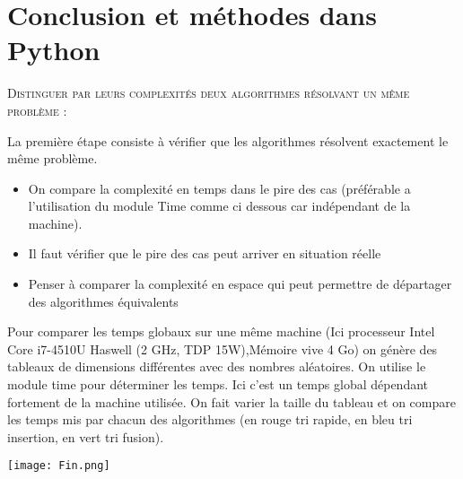 
\section{Conclusion et méthodes dans Python}



\begin{prop}

\textsc{Distinguer par leurs complexités deux algorithmes résolvant
un même problème :}

La première étape consiste à vérifier que les algorithmes résolvent exactement le même problème.

\begin{itemize}
\item On compare la complexité en temps dans le pire des cas (préférable a l'utilisation du module Time comme ci dessous car indépendant de la machine).
\item Il faut vérifier que le pire des cas peut arriver en situation réelle
\item Penser à comparer la complexité en espace qui peut permettre de départager des algorithmes équivalents
\end{itemize}
\end{prop}

\begin{exemple2}

Pour comparer les temps globaux sur une même machine (Ici processeur	Intel Core i7-4510U Haswell (2 GHz, TDP 15W),Mémoire vive 4 Go) on génère des tableaux de dimensions différentes avec des nombres aléatoires.
On utilise le module time pour déterminer les temps. Ici c'est un temps global dépendant fortement de la machine utilisée.
On fait varier la taille du tableau et on compare les temps mis par chacun des algorithmes (en rouge tri rapide, en bleu tri insertion, en vert tri fusion). 

\begin{center}
\texttt{[image: Fin.png]}
\end{center}

\end{exemple2}





